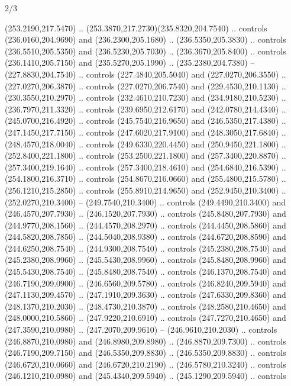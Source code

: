 \begin{flagdescription}{2/3}
\begin{scope}[xshift=0.5\flaglength,yshift=0.5\flagwidth,scale=\flagwidth/259.2]
\begin{scope}[y=0.8pt, x=0.8pt, yscale=-1,shift={(-243,-162)}]
      (253.2190,217.5470) .. (253.3870,217.2730)(235.8320,204.7540) .. controls
      (236.0160,204.9690) and (236.2300,205.1680) .. (236.5350,205.3830) .. controls
      (236.5510,205.5350) and (236.5230,205.7030) .. (236.3670,205.8400) .. controls
      (236.1410,205.7150) and (235.5270,205.1990) .. (235.2380,204.7380) --
      (227.8830,204.7540) .. controls (227.4840,205.5040) and (227.0270,206.3550) ..
      (227.0270,206.3870) .. controls (227.0270,206.7540) and (229.4530,210.1130) ..
      (230.3550,210.2970) .. controls (232.4610,210.7230) and (234.9180,210.5230) ..
      (236.7970,211.3320) .. controls (239.6950,212.6170) and (242.0780,214.4340) ..
      (245.0700,216.4920) .. controls (245.7540,216.9650) and (246.5350,217.4380) ..
      (247.1450,217.7150) .. controls (247.6020,217.9100) and (248.3050,217.6840) ..
      (248.4570,218.0040) .. controls (249.6330,220.4450) and (250.9450,221.1800) ..
      (252.8400,221.1800) .. controls (253.2500,221.1800) and (257.3400,220.8870) ..
      (257.3400,219.1640) .. controls (257.3400,218.4610) and (254.6840,216.5390) ..
      (254.1800,216.3710) .. controls (254.8670,216.0660) and (255.4800,215.5780) ..
      (256.1210,215.2850) .. controls (255.8910,214.9650) and (252.9450,210.3400) ..
      (252.0270,210.3400) -- (249.7540,210.3400) .. controls (249.4490,210.3400) and
      (246.4570,207.7930) .. (246.1520,207.7930) .. controls (245.8480,207.7930) and
      (244.9770,208.1560) .. (244.4570,208.2970) .. controls (244.4450,208.5860) and
      (244.5820,208.7850) .. (244.5040,208.9380) .. controls (244.6720,208.8590) and
      (244.6250,208.7540) .. (244.9300,208.7540) .. controls (245.2380,208.7540) and
      (245.2380,208.9960) .. (245.5430,208.9960) .. controls (245.8480,208.9960) and
      (245.5430,208.7540) .. (245.8480,208.7540) .. controls (246.1370,208.7540) and
      (246.7190,209.0900) .. (246.6560,209.5780) .. controls (246.8240,209.5940) and
      (247.1130,209.4570) .. (247.1910,209.3630) .. controls (247.6330,209.8360) and
      (248.1370,210.2030) .. (248.4730,210.3870) .. controls (248.2580,210.4650) and
      (248.0000,210.5860) .. (247.9220,210.6910) .. controls (247.7270,210.4650) and
      (247.3590,210.0980) .. (247.2070,209.9610) -- (246.9610,210.2030) .. controls
      (246.8870,210.0980) and (246.8980,209.8980) .. (246.8870,209.7300) .. controls
      (246.7190,209.7150) and (246.5350,209.8830) .. (246.5350,209.8830) .. controls
      (246.6720,210.0660) and (246.6720,210.2190) .. (246.5780,210.3240) .. controls
      (246.1210,210.0980) and (245.4340,209.5940) .. (245.1290,209.5940) .. controls

\end{scope}
\end{scope}
\end{flagdescription}
